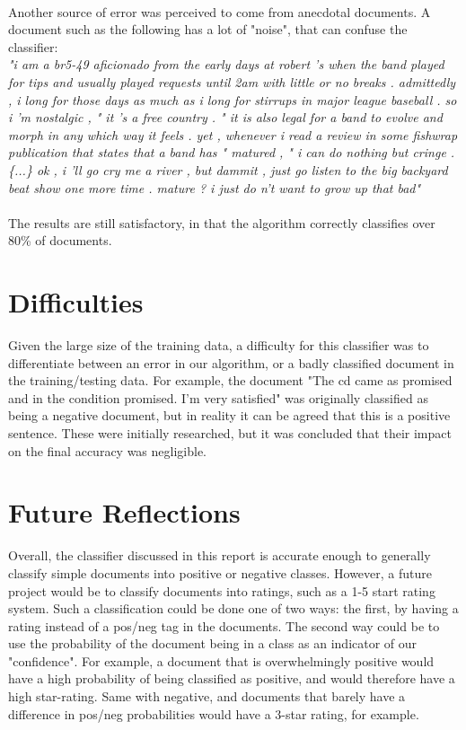 \documentclass[]{llncs}
\begin{document}
\paragraph{}
Another source of error was perceived to come from anecdotal documents. A document such as  the following has a lot of "noise", that can confuse the classifier:\\
\textit{"i am a br5-49 aficionado from the early days at robert 's when the band played for tips and usually played requests until 2am with little or no breaks . admittedly , i long for those days as much as i long for stirrups in major league baseball . so i 'm nostalgic , " it 's a free country . " it is also legal for a band to evolve and morph in any which way it feels . yet , whenever i read a review in some fishwrap publication that states that a band has " matured , " i can do nothing but cringe . \{...\} ok , i 'll go cry me a river , but dammit , just go listen to the big backyard beat show one more time . mature ? i just do n't want to grow up that bad"}
\paragraph{}
The results are still satisfactory, in that the algorithm correctly classifies over 80\% of documents.

\section{Difficulties}
Given the large size of the training data, a difficulty for this classifier was to differentiate between an error in our algorithm, or a badly classified document in the training/testing data. For example, the document "The cd came as promised and in the condition promised. I'm very satisfied" was originally classified as being a negative document, but in reality it can be agreed that this is a positive sentence. These were initially researched, but it was concluded that their impact on the final accuracy was negligible.

\section{Future Reflections}
Overall, the classifier discussed in this report is accurate enough to generally classify simple documents into positive or negative classes. However, a future project would be to classify documents into ratings, such as a 1-5 start rating system. Such a classification could be done one of two ways: the first, by having a rating instead of a pos/neg tag in the documents. The second way could be to use the probability of the document being in a class as an indicator of our "confidence". For example, a document that is overwhelmingly positive would have a high probability of being classified as positive, and would therefore have a high star-rating. Same with negative, and documents that barely have a difference in pos/neg probabilities would have a 3-star rating, for example.
\end{document}
